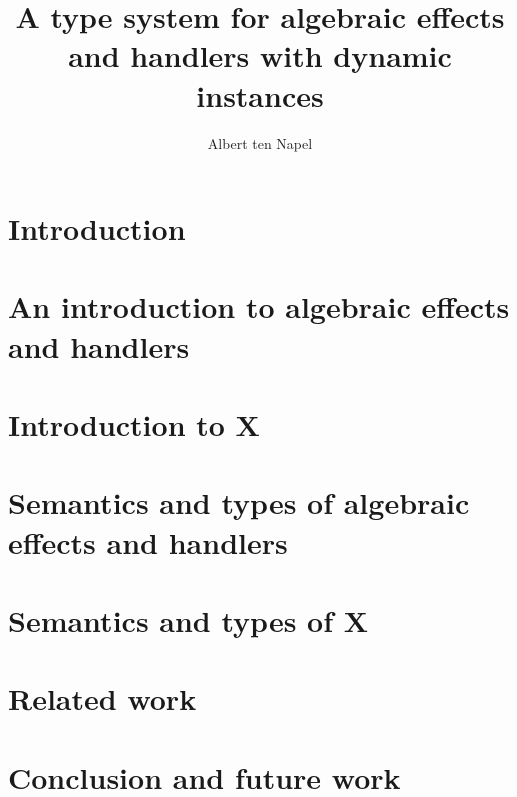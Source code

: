 \documentclass[12pt]{book}
\title{A type system for algebraic effects and handlers with dynamic instances}
\author{Albert ten Napel}
\date{}
\begin{document}
\maketitle

\tableofcontents
\newpage

\chapter{Introduction}


\chapter{An introduction to algebraic effects and handlers}


\chapter{Introduction to X}


\chapter{Semantics and types of algebraic effects and handlers}


\chapter{Semantics and types of X}


\chapter{Related work}


\chapter{Conclusion and future work}


\end{document}
